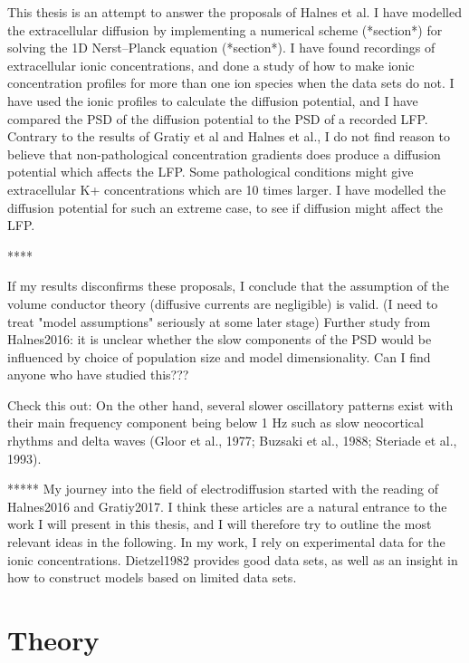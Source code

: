 \documentclass{article}
\begin{document}
This thesis is an attempt to answer the proposals of Halnes et al. I have modelled the extracellular diffusion by implementing a numerical scheme (*section*) for solving the 1D  Nerst--Planck equation (*section*). I have found recordings of extracellular ionic concentrations, and done a study of how to make ionic concentration profiles for more than one ion species when the data sets do not. I have used the ionic profiles to calculate the diffusion potential, and I have compared the PSD of the diffusion potential to the PSD of a recorded LFP. Contrary to the results of Gratiy et al and Halnes et al., I do not find reason to believe that non-pathological concentration gradients does produce a diffusion potential which affects the LFP. Some pathological conditions might give extracellular K+ concentrations which are 10 times larger. I have modelled the diffusion potential for such an extreme case, to see if diffusion might affect the LFP. 



****



If my results disconfirms these proposals, I conclude that the assumption of the volume conductor theory (diffusive currents are negligible) is valid. 
(I need to treat "model assumptions" seriously at some later stage)
Further study from Halnes2016: it is unclear whether the slow components of the PSD would be influenced by choice of population size and model dimensionality. Can I find anyone who have studied this???

Check this out: On the
other hand, several slower oscillatory patterns exist with their main
frequency component being below 1 Hz such as slow neocortical
rhythms and delta waves (Gloor et al., 1977; Buzsaki et al., 1988;
Steriade et al., 1993).


*****
My journey into the field of electrodiffusion started with the reading of Halnes2016 and Gratiy2017. I think these articles are a natural entrance to the work I will present in this thesis, and I will therefore try to outline the most relevant ideas in the following. In my work, I rely on experimental data for the ionic concentrations. Dietzel1982 provides good data sets, as well as an insight in how to construct models based on limited data sets. 


\section{Theory}
\end{document}
